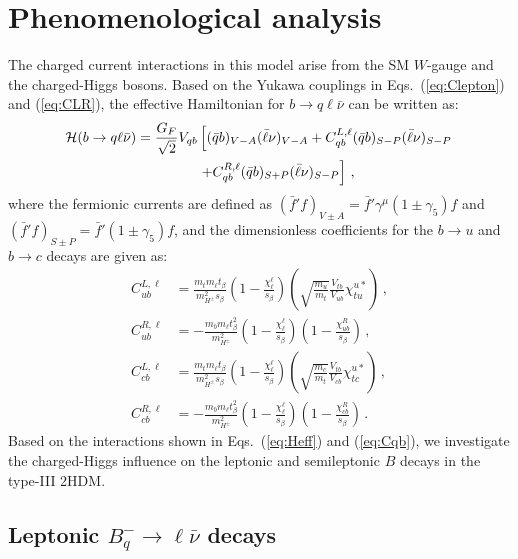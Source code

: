 \documentclass[prd,preprint,superscriptaddress,amsmath,amssymb]{revtex4}
\begin{document}
\section{ Phenomenological analysis}

The charged current interactions  in this model arise from the SM $W$-gauge and the charged-Higgs bosons. Based on the Yukawa couplings in Eqs.~(\ref{eq:Clepton}) and (\ref{eq:CLR}), 
the effective Hamiltonian for $b\to q \ell \bar\nu$  can be written as:
 \begin{align}
 {\cal H} (b\to q \ell \bar \nu)  =\frac{G_F}{\sqrt 2} V_{qb}& \left[(\bar q b)_{V-A}
 (\bar \ell \nu)_{V-A}+ C^{L,\ell}_{qb} (\bar q b)_{S-P}
 (\bar \ell \nu)_{S-P}  \right. \nonumber \\ 
 & \left. + C^{R,\ell}_{qb} (\bar q b)_{S+P}
 (\bar \ell \nu)_{S-P}
 \right]\,, \label{eq:Heff}
\end{align}
where the fermionic  currents are defined as $(\bar f' f)_{V\pm A}=\bar f' \gamma^\mu (1\pm \gamma_5) f$ and $(\bar f' f)_{S\pm P}=\bar f' (1\pm \gamma_5) f$, and the dimensionless coefficients for the $b\to u$ and $b\to c$ decays are given as:
\begin{subequations}
 \begin{align}
 C^{L,\ell}_{ub} &= \frac{m_t m_\ell t_\beta}{m^2_{H^\pm} s_\beta}  
 \left( 1 - \frac{\chi^\ell_\ell}{s_\beta}\right) \left( \sqrt{\frac{m_u}{ m_t}} \frac{V_{tb}}{V_{ub}}\chi^{u*}_{tu} \right) \,, \label{eq:cLlub}\\
 C^{R,\ell}_{ub} & = -\frac{m_b m_\ell t^2_\beta}{m^2_{H^\pm}}  \left( 1 - \frac{\chi^\ell_\ell}{s_\beta}\right) \left( 1- \frac{\chi^{R}_{ub}}{s_\beta}\right)\,, \label{eq:cRlub}\\
 C^{L,\ell}_{cb} & =  \frac{m_t m_\ell t_\beta}{m^2_{H^\pm} s_\beta}  
 \left( 1 - \frac{\chi^\ell_\ell}{s_\beta}\right)  \left( \sqrt{\frac{m_c}{m_t}} \frac{V_{tb}}{V_{cb}}\chi^{u*}_{tc}\right)\,, \label{eq:cLlcb} \\
 C^{R,\ell}_{cb} & = -\frac{m_b m_\ell t^2_\beta}{m^2_{H^\pm}}  \left( 1 - \frac{\chi^\ell_\ell}{s_\beta}\right) \left( 1 - \frac{\chi^R_{cb} }{s_\beta}\right)\,.   \label{eq:cRlcb}
 \end{align}
\label{eq:Cqb}
 \end{subequations}
Based on the interactions shown in Eqs.~(\ref{eq:Heff}) and (\ref{eq:Cqb}), we investigate  the  charged-Higgs  influence on  the  leptonic and semileptonic $B$ decays in the type-III 2HDM. 

\subsection{ \bf  Leptonic $B^-_{q} \to \ell \bar \nu$ decays}
\end{document}
